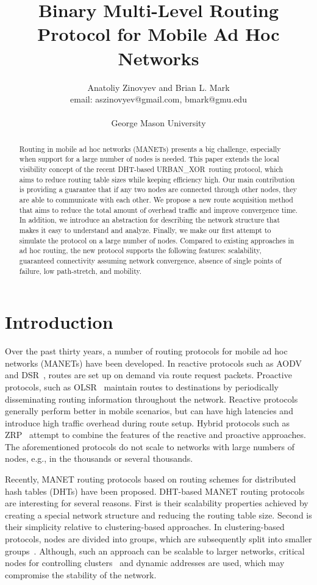 \documentclass[conference]{IEEEtran}
\title{Binary Multi-Level Routing Protocol for Mobile Ad Hoc Networks}
\author{
  Anatoliy Zinovyev and Brian L. Mark \\
  email: aszinovyev@gmail.com, bmark@gmu.edu \\
   \\
  George Mason University \\
}
\theoremstyle{definition}
\newcommand{\urbanxor}{URBAN\_XOR}
\begin{document}
\maketitle

\begin{abstract}
Routing in mobile ad hoc networks (MANETs) presents a big challenge, especially when support for a large number of nodes is needed. This paper extends the local visibility concept of the recent DHT-based \urbanxor~routing protocol, which aims to reduce routing table sizes while keeping efficiency high. Our main contribution is providing a guarantee that if any two nodes are connected through other nodes, they are able to communicate with each other. We propose a new route acquisition method that aims to reduce the total amount of overhead traffic and improve convergence time. In addition, we introduce an abstraction for describing the network structure that makes it easy to understand and analyze. Finally, we make our first attempt to simulate the protocol on a large number of nodes. Compared to existing approaches in ad hoc routing, the new protocol supports the following features: scalability, guaranteed connectivity assuming network convergence, absence of single points of failure, low path-stretch, and mobility.
\end{abstract}



\section{Introduction}
\label{sec:introduction}

Over the past thirty years, a number of routing protocols for mobile ad hoc networks (MANETs) have been developed.
In reactive protocols such as AODV~\cite{aodv} and DSR~\cite{dsr}, routes are set up  on demand via route request packets.  Proactive protocols, such as OLSR~\cite{olsr} maintain routes to destinations by periodically disseminating routing information throughout the network. Reactive protocols generally perform better in mobile scenarios, but can have high latencies and introduce high traffic overhead during route setup.  Hybrid protocols such as ZRP~\cite{zrp} attempt to combine the features of the reactive and proactive approaches.  The aforementioned protocols do not scale to networks with large numbers of nodes, e.g., in the thousands or several thousands. 
  
Recently, MANET routing protocols based on routing schemes for distributed hash tables (DHTs) have been proposed.  DHT-based MANET routing protocols  are interesting for several reasons. First is their scalability properties achieved by creating a special network structure and reducing the routing table size. Second is their simplicity relative to clustering-based approaches. In clustering-based protocols, nodes are divided into groups, which are subsequently split into smaller groups~\cite{Hong}. Although, such an approach can be scalable to larger networks, critical nodes for controlling clusters~\cite{Hong} and dynamic addresses \cite{Hong,dart,ntk} are used, which may compromise the stability of the network.
\end{document}
